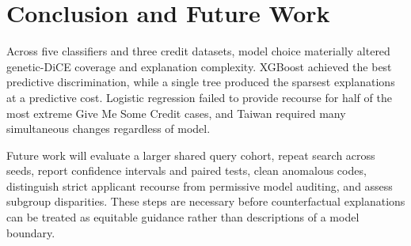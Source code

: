 \documentclass[conference]{IEEEtran}
\begin{document}
\section{Conclusion and Future Work}
Across five classifiers and three credit datasets, model choice materially altered genetic-DiCE coverage and explanation complexity. XGBoost achieved the best predictive discrimination, while a single tree produced the sparsest explanations at a predictive cost. Logistic regression failed to provide recourse for half of the most extreme Give Me Some Credit cases, and Taiwan required many simultaneous changes regardless of model.

Future work will evaluate a larger shared query cohort, repeat search across seeds, report confidence intervals and paired tests, clean anomalous codes, distinguish strict applicant recourse from permissive model auditing, and assess subgroup disparities. These steps are necessary before counterfactual explanations can be treated as equitable guidance rather than descriptions of a model boundary.



\end{document}
